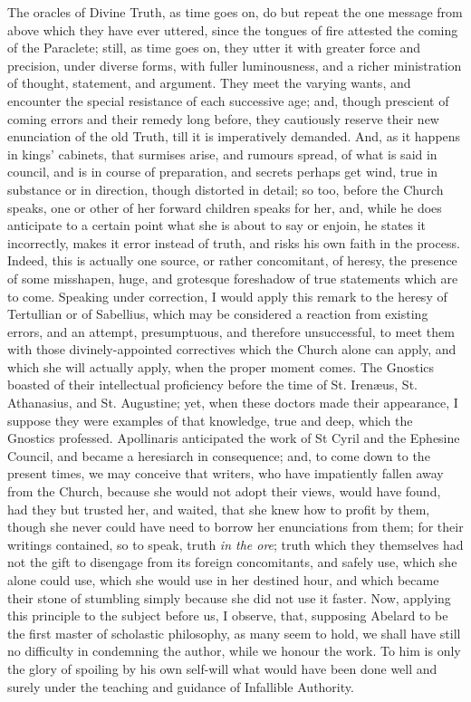 The oracles of Divine Truth,
as time goes on, do but repeat the one message from above which they
have ever uttered, since the tongues of fire attested the coming of
the Paraclete; still, as time goes on, they utter it with greater
force and precision, under diverse forms, with fuller luminousness,
and a richer ministration of thought, statement, and argument. They
meet the varying wants, and encounter the special resistance of each
successive age; and, though prescient of coming errors and their
remedy long before, they cautiously reserve their new enunciation of
the old Truth, till it is imperatively demanded. And, as it happens in
kings' cabinets, that surmises arise, and rumours spread, of what is
said in council, and is in course of preparation, and secrets perhaps
get wind, true in substance or in direction, though distorted in
detail; so too, before the Church speaks, one or other of her forward
children speaks for her, and, while he does anticipate to a certain
point what she is about to say or enjoin, he states it incorrectly,
makes it error instead of truth, and risks his own faith in the
process. Indeed, this is actually one source, or rather concomitant,
of heresy, the presence of some misshapen, huge, and grotesque
foreshadow of true statements which are to come. Speaking under
correction, I would apply this remark to the heresy of Tertullian or
of Sabellius, which may be considered a reaction from existing errors,
and an attempt, presumptuous, and therefore unsuccessful, to meet them
with those divinely-appointed correctives which the Church alone can
apply, and which she will actually apply, when the proper moment
comes. The Gnostics boasted of their intellectual proficiency before
the time of St. Irenæus, St. Athanasius, and St. Augustine; yet, when
these doctors made their appearance, I suppose they were examples of
that knowledge, true and deep, which the Gnostics professed.
Apollinaris anticipated the work of St Cyril and the Ephesine Council,
and became a heresiarch in consequence; and, to come down to the
present times, we may conceive that writers, who have impatiently
fallen away from the Church, because she would not adopt their views,
would have found, had they but trusted her, and waited, that she knew
how to profit by them, though she never could have need to borrow
her enunciations from them; for their writings contained, so to
speak, truth \emph{in the ore}; truth which they themselves had not
the gift to disengage from its foreign concomitants, and safely use,
which she alone could use, which she would use in her destined hour,
and which became their stone of stumbling simply because she did not
use it faster. Now, applying this principle to the subject before us,
I observe, that, supposing Abelard to be the first master of
scholastic philosophy, as many seem to hold, we shall have still no
difficulty in condemning the author, while we honour the work. To him
is only the glory of spoiling by his own self-will what would have
been done well and surely under the teaching and guidance of
Infallible Authority.

